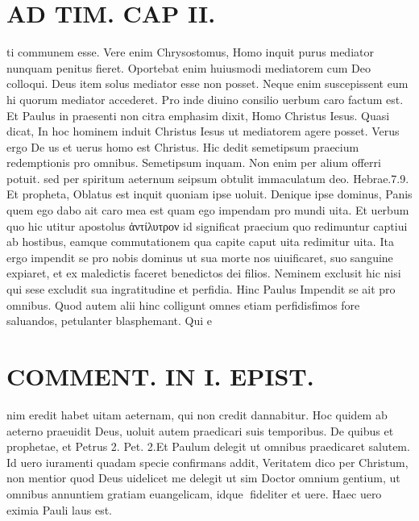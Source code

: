 \documentclass{article}
\begin{document}
\begin{pages}
\section*{AD TIM. CAP II. }
\marginpar{[ p.117 ]}\pstart ti communem esse. Vere enim Chrysostomus, Homo inquit purus mediator nunquam penitus fieret. Oportebat enim huiusmodi mediatorem cum Deo colloqui. Deus item solus mediator esse non posset. Neque enim suscepissent eum hi quorum mediator accederet. Pro inde diuino consilio uerbum caro factum est. Et Paulus in praesenti non citra emphasim dixit, Homo Christus Iesus. Quasi dicat, In hoc hominem induit Christus Iesus ut mediatorem agere posset. Verus ergo De us et uerus homo est Christus. Hic dedit semetipsum praecium redemptionis pro omnibus. Semetipsum inquam. Non enim per alium offerri potuit. sed per spiritum aeternum seipsum obtulit immaculatum deo. Hebrae.7.9. Et propheta, Oblatus est inquit quoniam ipse uoluit. Denique ipse dominus, Panis quem ego dabo ait caro mea est quam ego impendam pro mundi uita. Et uerbum quo hic utitur apostolus ἀντίλυτρον id significat praecium quo redimuntur captiui ab hostibus, eamque commutationem qua capite caput uita redimitur uita. Ita ergo impendit se pro nobis dominus ut sua morte nos uiuificaret, suo sanguine expiaret, et ex maledictis faceret benedictos dei filios. Neminem exclusit hic nisi qui sese excludit sua ingratitudine et perfidia. Hinc Paulus Impendit se ait pro omnibus. Quod autem alii hinc colligunt omnes etiam perfidisfimos fore saluandos, petulanter blasphemant. Qui e\pend
\section*{COMMENT. IN I. EPIST. }\pstart nim eredit habet uitam aeternam, qui non credit dannabitur. Hoc quidem ab aeterno praeuidit Deus, uoluit autem praedicari suis temporibus. De quibus et prophetae, et Petrus 2. Pet. 2.Et Paulum delegit ut omnibus praedicaret salutem. Id uero iuramenti quadam specie confirmans addit, Veritatem dico per Christum, non mentior quod Deus uidelicet me delegit ut sim Doctor omnium gentium, ut omnibus annuntiem gratiam euangelicam, idque fideliter et uere. Haec uero eximia Pauli laus est.  \pend
{}
{}

\end{pages}
\end{document}
